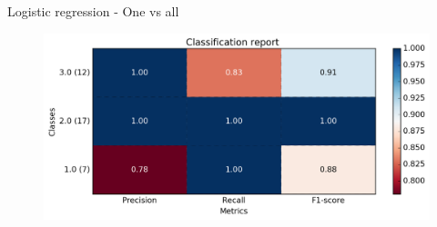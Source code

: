 \documentclass[xcolor=x11names,compress]{beamer}
\renewcommand{\(}{\begin{columns}}
\renewcommand{\)}{\end{columns}}
\newcommand{\<}[1]{\begin{column}{#1}}
\renewcommand{\>}{\end{column}}
\begin{document}
\begin{frame}{Logistic regression - One vs all}
        \begin{figure}\includegraphics[width=1\textwidth]{one_vs_all.png} \end{figure}

\end{frame}
\end{document}
